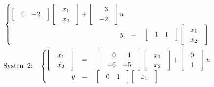 \documentclass[11pt]{article}
\begin{document}
\begin{enumerate}
\begin{align*}
\begin{cases}
\begin{bmatrix*}[r]
                &0 & -2&
            \end{bmatrix*}
            \begin{bmatrix*}[r]
                &x_1&\\
                &x_2&
            \end{bmatrix*}+
            \begin{bmatrix*}[r]
                &3&\\
                &-2&
            \end{bmatrix*}u
            \\
            \hfill y&=\quad
            \begin{bmatrix*}[r]
                &1&1&
            \end{bmatrix*}
            \begin{bmatrix*}[r]
                &x_1&\\
                &x_2&
            \end{bmatrix*}\\
        \end{cases}
    \end{align*}
    \begin{align*}
        \text{System 2:}\quad
        \begin{cases}
            \begin{bmatrix*}[r]
                &\dot{x_1}&\\
                &\dot{x_2}&
            \end{bmatrix*}
            &=\quad
            \begin{bmatrix*}[r]
                &0 & 1&\\
                &-6 & -5&
            \end{bmatrix*}
            \begin{bmatrix*}[r]
                &x_1&\\
                &x_2&
            \end{bmatrix*}+
            \begin{bmatrix*}[r]
                &0&\\
                &1&
            \end{bmatrix*}u
            \\
            \hfill y&=\quad
            \begin{bmatrix*}[r]
                &0&1&
            \end{bmatrix*}
            \begin{bmatrix*}[r]
                &x_1&\\

\end{bmatrix*}
\end{cases}
\end{align*}
\end{enumerate}
\end{document}
